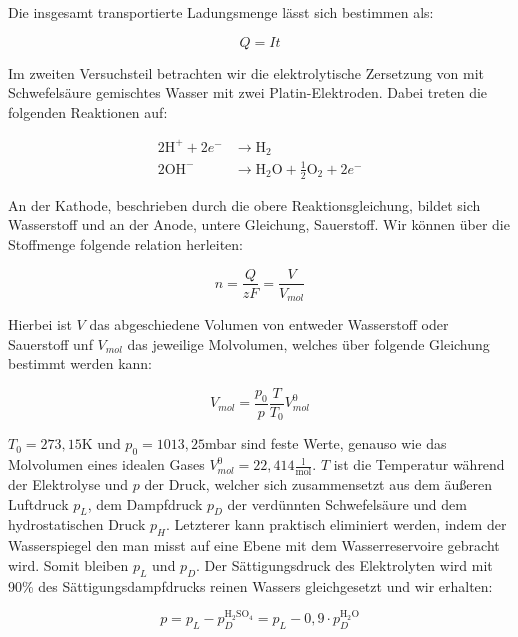 \documentclass{article}
\begin{document}
Die insgesamt transportierte Ladungsmenge lässt sich bestimmen als:

\begin{equation}
    Q=It
    \label{eq:Q}
\end{equation}

Im zweiten Versuchsteil betrachten wir die elektrolytische Zersetzung von mit Schwefelsäure gemischtes Wasser mit zwei Platin-Elektroden. Dabei treten die folgenden Reaktionen auf:

\begin{equation}
    \begin{split}
        2\text{H}^+ + 2e^- &\rightarrow \text{H}_2 \\
        2\text{OH}^- &\rightarrow \text{H}_2 \text{O} + \frac{1}{2} \text{O}_2 + 2e^-
    \end{split}
    \label{eq:elektrolyse2}
\end{equation}

An der Kathode, beschrieben durch die obere Reaktionsgleichung, bildet sich Wasserstoff und an der Anode, untere Gleichung, Sauerstoff. Wir können über die Stoffmenge folgende relation herleiten:

\begin{equation}
    n = \frac{Q}{zF} = \frac{V}{V_{mol}}
    \label{eq:F2}
\end{equation}

Hierbei ist $V$ das abgeschiedene Volumen von entweder Wasserstoff oder Sauerstoff unf $V_{mol}$ das jeweilige Molvolumen, welches über folgende Gleichung bestimmt werden kann:

\begin{equation}
    V_{mol} = \frac{p_0}{p} \frac{T}{T_0} V_{mol}^0
    \label{eq:Vmol}
\end{equation}

$T_0 = 273,15$K und $p_0 = 1013,25$mbar sind feste Werte, genauso wie das Molvolumen eines idealen Gases $V_{mol}^0 = 22,414 \frac{\text{l}}{\text{mol}}$. $T$ ist die Temperatur während der Elektrolyse und $p$ der Druck, welcher sich zusammensetzt aus dem äußeren Luftdruck $p_L$, dem Dampfdruck $p_D$ der verdünnten Schwefelsäure und dem hydrostatischen Druck $p_H$. Letzterer kann praktisch eliminiert werden, indem der Wasserspiegel den man misst auf eine Ebene mit dem Wasserreservoire gebracht wird. Somit bleiben $p_L$ und $p_D$. Der Sättigungsdruck des Elektrolyten wird mit 90\% des Sättigungsdampfdrucks reinen Wassers gleichgesetzt und wir erhalten:

\begin{equation}
    p= p_L - p_D^{\text{H$_2$SO$_4$}} = p_L - 0,9 \cdot p_D^{\text{H$_2$O}}
    \label{eq:druck}
\end{equation}
\end{document}
